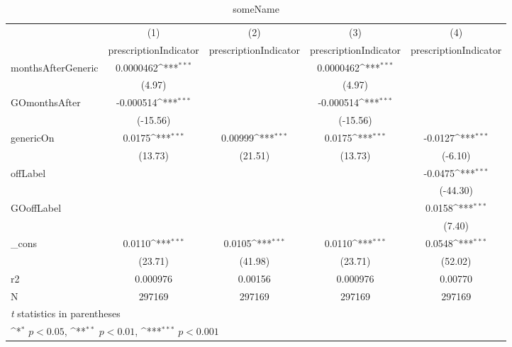 \begin{table}[htbp]\centering
\def\sym#1{\ifmmode^{#1}\else\(^{#1}\)\fi}
\caption{someName\label{tab1}}
\begin{tabular}{l*{4}{c}}
\hline\hline
            &\multicolumn{1}{c}{(1)}&\multicolumn{1}{c}{(2)}&\multicolumn{1}{c}{(3)}&\multicolumn{1}{c}{(4)}\\
            &\multicolumn{1}{c}{prescriptionIndicator}&\multicolumn{1}{c}{prescriptionIndicator}&\multicolumn{1}{c}{prescriptionIndicator}&\multicolumn{1}{c}{prescriptionIndicator}\\
\hline
monthsAfterGeneric&   0.0000462\sym{***}&                     &   0.0000462\sym{***}&                     \\
            &      (4.97)         &                     &      (4.97)         &                     \\
[1em]
GOmonthsAfter&   -0.000514\sym{***}&                     &   -0.000514\sym{***}&                     \\
            &    (-15.56)         &                     &    (-15.56)         &                     \\
[1em]
genericOn   &      0.0175\sym{***}&     0.00999\sym{***}&      0.0175\sym{***}&     -0.0127\sym{***}\\
            &     (13.73)         &     (21.51)         &     (13.73)         &     (-6.10)         \\
[1em]
offLabel    &                     &                     &                     &     -0.0475\sym{***}\\
            &                     &                     &                     &    (-44.30)         \\
[1em]
GOoffLabel  &                     &                     &                     &      0.0158\sym{***}\\
            &                     &                     &                     &      (7.40)         \\
[1em]
\_cons      &      0.0110\sym{***}&      0.0105\sym{***}&      0.0110\sym{***}&      0.0548\sym{***}\\
            &     (23.71)         &     (41.98)         &     (23.71)         &     (52.02)         \\
\hline
r2          &    0.000976         &     0.00156         &    0.000976         &     0.00770         \\
N           &      297169         &      297169         &      297169         &      297169         \\
\hline\hline
\multicolumn{5}{l}{\footnotesize \textit{t} statistics in parentheses}\\
\multicolumn{5}{l}{\footnotesize \sym{*} \(p<0.05\), \sym{**} \(p<0.01\), \sym{***} \(p<0.001\)}\\
\end{tabular}
\end{table}
